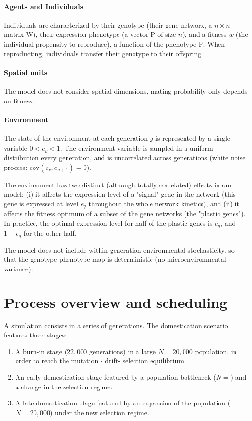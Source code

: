 \documentclass{article}
\begin{document}
\paragraph{Agents and Individuals}

Individuals are characterized  by their genotype (their gene network, a $n \times n$ matrix $\bm{\mathrm W}$), their expression phenotype (a vector $\bm{\mathrm P}$ of size $n$), and a fitness $w$ (the individual propensity to reproduce), a function of the phenotype $\bm{\mathrm P}$. When reproducting, individuals transfer their genotype to their offspring. 

\paragraph{Spatial units}

The model does not consider spatial dimensions, mating probability only depends on fitness. 

\paragraph{Environment}

The state of the environment at each generation $g$ is represented by a single variable $0 < e_g < 1$. The environment variable is sampled in a uniform distribution every generation, and is uncorrelated across generations (white noise process: $\mathrm{cov} (e_g, e_{g+1}) = 0$). 

The environment has two distinct (although totally correlated) effects in our model: (i) it affects the expression level of a "signal" gene in the network (this gene is expressed at level $e_g$ throughout the whole network kinetics), and (ii) it affects the fitness optimum of a subset of the gene networks (the "plastic genes"). In practice, the optimal expression level for half of the plastic genes is $e_g$, and $1-e_g$ for the other half. 

The model does not include within-generation environmental stochasticity, so that the genotype-phenotype map is deterministic (no microenvironmental variance). 

\section{Process overview and scheduling}

A simulation consists in a series of generations. The domestication scenario features three stages:
\begin{enumerate}
\item A burn-in stage ($22,000$ generations) in a large $N=20,000$ population, in order to reach the mutation - drift- selection equilibrium.
\item An early domestication stage featured by a population bottleneck ($N=$) and a change in the selection regime.
\item A late domestication stage featured by an expansion of the population ($N=20,000$) under the new selection regime. 
\end{enumerate}
\end{document}
